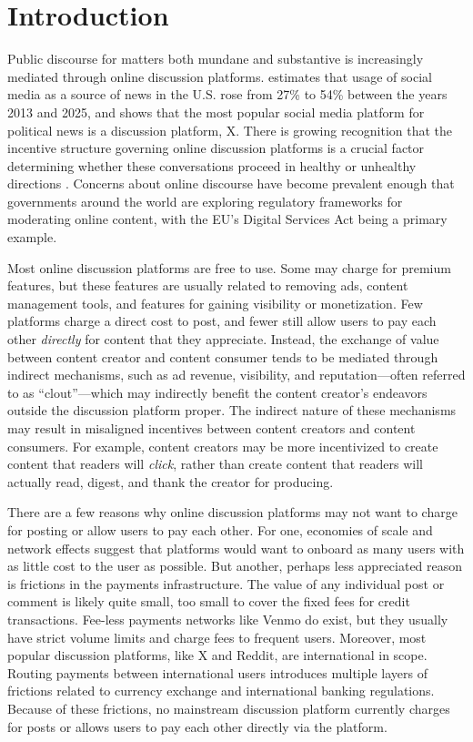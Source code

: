\section{Introduction} \label{sec_intro}

Public discourse for matters both mundane and substantive is increasingly mediated through online discussion platforms. \citet{newman2025digitalnews} estimates that usage of social media as a source of news in the U.S. rose from 27\% to 54\% between the years 2013 and 2025, and \citet{mcclain2024pew} shows that the most popular social media platform for political news is a discussion platform, X. There is growing recognition that the incentive structure governing online discussion platforms is a crucial factor determining whether these conversations proceed in healthy or unhealthy directions \citep{aridor2024}. Concerns about online discourse have become prevalent enough that governments around the world are exploring regulatory frameworks for moderating online content, with the EU's Digital Services Act being a primary example.

Most online discussion platforms are free to use. Some may charge for premium features, but these features are usually related to removing ads, content management tools, and features for gaining visibility or monetization. Few platforms charge a direct cost to post, and fewer still allow users to pay each other \emph{directly} for content that they appreciate. Instead, the exchange of value between content creator and content consumer tends to be mediated through indirect mechanisms, such as ad revenue, visibility, and reputation---often referred to as ``clout''---which may indirectly benefit the content creator's endeavors outside the discussion platform proper. The indirect nature of these mechanisms may result in misaligned incentives between content creators and content consumers. For example, content creators may be more incentivized to create content that readers will \emph{click}, rather than create content that readers will actually read, digest, and thank the creator for producing.

There are a few reasons why online discussion platforms may not want to charge for posting or allow users to pay each other. For one, economies of scale and network effects suggest that platforms would want to onboard as many users with as little cost to the user as possible. But another, perhaps less appreciated reason is frictions in the payments infrastructure. The value of any individual post or comment is likely quite small, too small to cover the fixed fees for credit transactions. Fee-less payments networks like Venmo do exist, but they usually have strict volume limits and charge fees to frequent users. Moreover, most popular discussion platforms, like X and Reddit, are international in scope. Routing payments between international users introduces multiple layers of frictions related to currency exchange and international banking regulations. Because of these frictions, no mainstream discussion platform currently charges for posts or allows users to pay each other directly via the platform.

